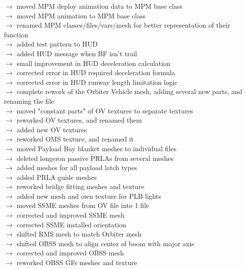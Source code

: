 \documentclass[Space_Shuttle_Vessel_Manual.tex]{subfiles}
\begin{document}
$\rightarrow$ moved MPM deploy animation data to MPM base class\\
$\rightarrow$ moved MPM animation to MPM base class\\
$\rightarrow$ renamed MPM classes/files/vars/mesh for better representation of their function\\
$\rightarrow$ added test pattern to HUD\\
$\rightarrow$ added HUD message when BF isn't trail\\
$\rightarrow$ small improvement in HUD deceleration calculation\\
$\rightarrow$ corrected error in HUD required deceleration formula\\
$\rightarrow$ corrected error in HUD runway length limitation logic\\
$\rightarrow$ complete rework of the Orbiter Vehicle mesh, adding several new parts, and renaming the file\\
$\rightarrow$ moved "constant parts" of OV textures to separate textures\\
$\rightarrow$ reworked OV textures, and renamed them\\
$\rightarrow$ added new OV textures\\
$\rightarrow$ reworked OMS texture, and renamed it\\
$\rightarrow$ moved Payload Bay blanket meshes to individual files\\
$\rightarrow$ deleted longeron passive PRLAs from several meshes\\
$\rightarrow$ added meshes for all payload latch types\\
$\rightarrow$ added PRLA guide meshes\\
$\rightarrow$ reworked bridge fitting meshes and texture\\
$\rightarrow$ added new mesh and own texture for PLB lights\\
$\rightarrow$ moved SSME meshes from OV file into 1 file\\
$\rightarrow$ corrected and improved SSME mesh\\
$\rightarrow$ corrected SSME installed orientation\\
$\rightarrow$ shifted RMS mesh to match Orbiter mesh\\
$\rightarrow$ shifted OBSS mesh to align center of boom with major axis\\
$\rightarrow$ corrected and improved OBSS mesh\\
$\rightarrow$ reworked OBSS GFs meshes and texture\\
\end{document}

